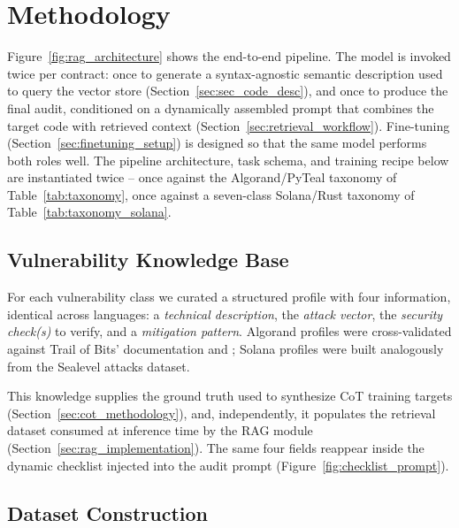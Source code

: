 \documentclass[lettersize,journal]{IEEEtran}
\begin{document}
\section{Methodology}
\label{sec:methodology}


Figure~\ref{fig:rag_architecture} shows the end-to-end pipeline. The model is invoked twice per
contract: once to generate a syntax-agnostic semantic description used to query the vector store
(Section~\ref{sec:sec_code_desc}), and once to produce the final audit, conditioned on a dynamically
assembled prompt that combines the target code with retrieved context
(Section~\ref{sec:retrieval_workflow}). Fine-tuning (Section~\ref{sec:finetuning_setup}) is designed
so that the same model performs both roles well. The pipeline architecture, task schema, and
training recipe below are instantiated twice -- once against the
Algorand/PyTeal taxonomy of Table~\ref{tab:taxonomy}, once against a seven-class Solana/Rust
taxonomy of Table~\ref{tab:taxonomy_solana}.

\subsection{Vulnerability Knowledge Base}
\label{sec:kb}

For each vulnerability class we curated a structured profile with four information, identical across
languages: a \emph{technical description}, the \emph{attack vector}, the \emph{security check(s)} to
verify, and a \emph{mitigation pattern}. Algorand profiles were cross-validated against Trail of
Bits' documentation \cite{trailofbits_algorand} and \cite{boi2025}; Solana profiles were built
analogously from the Sealevel attacks dataset. 

This knowledge supplies the ground truth used
to synthesize CoT training targets (Section~\ref{sec:cot_methodology}), and, independently, it
populates the retrieval dataset consumed at inference time by the RAG module
(Section~\ref{sec:rag_implementation}). The same four fields reappear inside the dynamic
checklist injected into the audit prompt (Figure~\ref{fig:checklist_prompt}).

\subsection{Dataset Construction}
\label{sec:dataset_creation}
\end{document}
